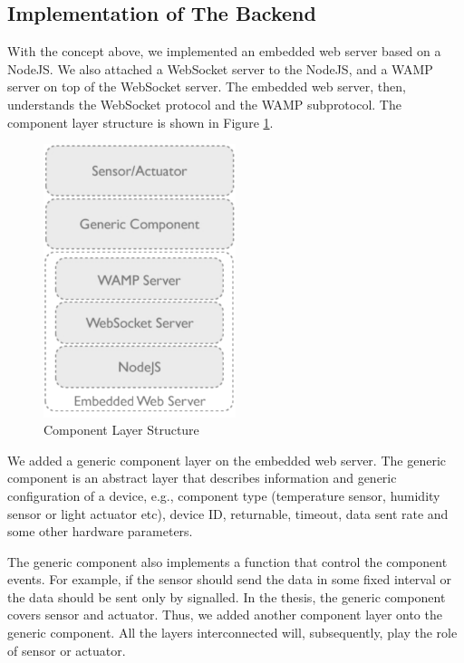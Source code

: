 \subsection{Implementation of The Backend}
With the concept above, we implemented an embedded web server based on a NodeJS. We also attached a WebSocket server to the NodeJS, and a WAMP server on top of the WebSocket server. The embedded web server, then, understands the WebSocket protocol and the WAMP subprotocol. The component layer structure is shown in Figure  \ref{fig:component-layer-structure}. 

\begin{figure}[ht]
  \begin{center}
    \includegraphics[width=0.5\textwidth]{images/component-layer-structure.pdf}
    \caption{Component Layer Structure}
    \label{fig:component-layer-structure}
  \end{center}
\end{figure}

We added a generic component layer on the embedded web server. The generic component is an abstract layer that describes information and generic configuration of a device, e.g., component type (temperature sensor, humidity sensor or light actuator etc), device ID, returnable, timeout, data sent rate and some other hardware parameters. 

The generic component also implements a function that control the component events. For example, if the sensor should send the data in some fixed interval or the data should be sent only by signalled. In the thesis, the generic component covers sensor and actuator. Thus, we added another component layer onto the generic component. All the layers interconnected will, subsequently, play the role of sensor or actuator.


